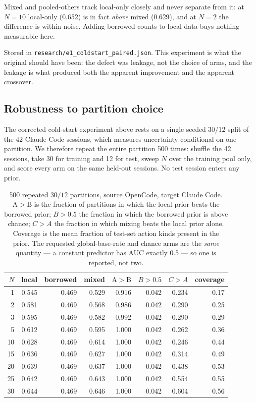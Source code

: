 \documentclass[11pt]{article}
\begin{document}
Mixed and pooled-others track local-only closely and never separate from it:
at $N=10$ local-only (0.652) is in fact \emph{above} mixed (0.629), and at
$N=2$ the difference is within noise. Adding borrowed counts to local data
buys nothing measurable here.

Stored in \texttt{research/e1\_coldstart\_paired.json}. This experiment is
what the original should have been: the defect was leakage, not the choice of
arms, and the leakage is what produced both the apparent improvement and the
apparent crossover.

\subsection{Robustness to partition choice}
\label{sec:partitions}

The corrected cold-start experiment above rests on a single seeded $30/12$ split
of the 42 Claude Code sessions, which measures uncertainty conditional on one
partition. We therefore repeat the entire partition 500 times: shuffle the 42
sessions, take 30 for training and 12 for test, sweep $N$ over the training pool
only, and score every arm on the same held-out sessions. No test session enters
any prior.

\begin{table}[t]
\centering
\caption{500 repeated $30/12$ partitions, source OpenCode, target Claude Code.
$\mathrm{A}{>}\mathrm{B}$ is the fraction of partitions in which the local prior
beats the borrowed prior; $B{>}0.5$ the fraction in which the borrowed prior is
above chance; $C{>}A$ the fraction in which mixing beats the local prior alone.
Coverage is the mean fraction of test-set action kinds present in the prior.
The requested global-base-rate and chance arms are the \emph{same} quantity --- a
constant predictor has AUC exactly 0.5 --- so one is reported, not two.}
\label{tab:partitions}
\small
\begin{tabular}{rrrrrrrr}
\toprule
$N$ & local & borrowed & mixed & $\mathrm{A}{>}\mathrm{B}$ & $B{>}0.5$ & $C{>}A$ & coverage \\
\midrule
 1 & 0.545 & 0.469 & 0.529 & 0.916 & 0.042 & 0.234 & 0.17 \\
 2 & 0.581 & 0.469 & 0.568 & 0.986 & 0.042 & 0.290 & 0.25 \\
 3 & 0.595 & 0.469 & 0.582 & 0.992 & 0.042 & 0.290 & 0.29 \\
 5 & 0.612 & 0.469 & 0.595 & 1.000 & 0.042 & 0.262 & 0.36 \\
10 & 0.628 & 0.469 & 0.614 & 1.000 & 0.042 & 0.246 & 0.44 \\
15 & 0.636 & 0.469 & 0.627 & 1.000 & 0.042 & 0.314 & 0.49 \\
20 & 0.639 & 0.469 & 0.637 & 1.000 & 0.042 & 0.438 & 0.53 \\
25 & 0.642 & 0.469 & 0.643 & 1.000 & 0.042 & 0.554 & 0.55 \\
30 & 0.644 & 0.469 & 0.646 & 1.000 & 0.042 & 0.604 & 0.56 \\
\bottomrule
\end{tabular}
\end{table}
\end{document}

